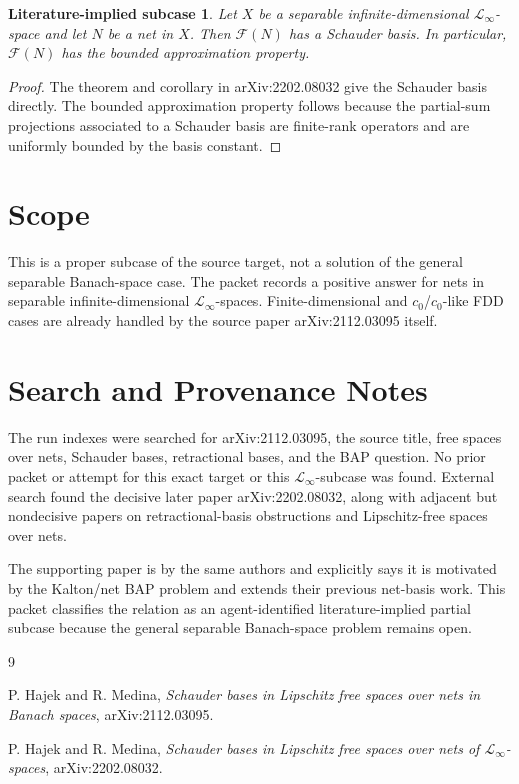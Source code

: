 \documentclass[11pt]{amsart}
\newtheorem*{theorem*}{Literature-implied subcase}
\begin{document}
\begin{theorem*}
Let \(X\) be a separable infinite-dimensional \(\mathcal L_\infty\)-space and
let \(N\) be a net in \(X\). Then \(\mathcal F(N)\) has a Schauder basis.
In particular, \(\mathcal F(N)\) has the bounded approximation property.
\end{theorem*}

\begin{proof}
The theorem and corollary in arXiv:2202.08032 give the Schauder basis directly.
The bounded approximation property follows because the partial-sum projections
associated to a Schauder basis are finite-rank operators and are uniformly
bounded by the basis constant.
\end{proof}

\section*{Scope}

This is a proper subcase of the source target, not a solution of the general
separable Banach-space case. The packet records a positive answer for nets in
separable infinite-dimensional \(\mathcal L_\infty\)-spaces. Finite-dimensional
and \(c_0\)/\(c_0\)-like FDD cases are already handled by the source paper
arXiv:2112.03095 itself.

\section*{Search and Provenance Notes}

The run indexes were searched for arXiv:2112.03095, the source title, free
spaces over nets, Schauder bases, retractional bases, and the BAP question.
No prior packet or attempt for this exact target or this
\(\mathcal L_\infty\)-subcase was found. External search found the decisive
later paper arXiv:2202.08032, along with adjacent but nondecisive papers on
retractional-basis obstructions and Lipschitz-free spaces over nets.

The supporting paper is by the same authors and explicitly says it is
motivated by the Kalton/net BAP problem and extends their previous net-basis
work. This packet classifies the relation as an agent-identified
literature-implied partial subcase because the general separable Banach-space
problem remains open.

\begin{thebibliography}{9}

P. Hajek and R. Medina,
\emph{Schauder bases in Lipschitz free spaces over nets in Banach spaces},
arXiv:2112.03095.

P. Hajek and R. Medina,
\emph{Schauder bases in Lipschitz free spaces over nets of
\(\mathcal L_\infty\)-spaces},
arXiv:2202.08032.

\end{thebibliography}
\end{document}

